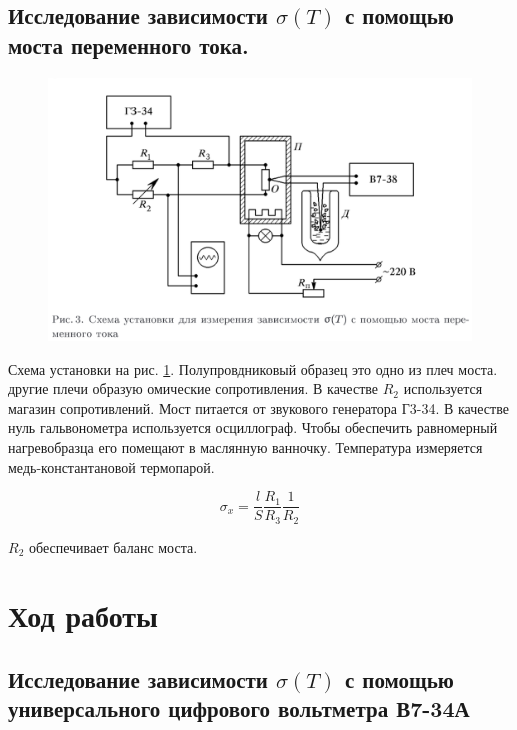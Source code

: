 \documentclass[a4paper]{article}
\begin{document}
\subsection{Исследование зависимости $\sigma(T)$ с помощью моста переменного тока.}

\begin{figure}[H]
    \begin{center}
        \includegraphics[scale = 0.5]{setup2.png}
        \caption{}
        \label{setup2}
    \end{center}
\end{figure}

Схема установки на рис. \ref{setup2}. Полупровдниковый образец это одно из плеч моста. другие плечи образую омические сопротивления. 
В качестве $R_2$ используется магазин сопротивлений. Мост питается от звукового генератора Г3-34. В качестве нуль гальвонометра используется осциллограф. 
Чтобы обеспечить равномерный нагревобразца его помещают в маслянную ванночку. Температура измеряется медь-константановой термопарой. 

\begin{equation}
    \sigma_x = \frac{l}{S} \frac{R_1}{R_3} \frac{1}{R_2}
\end{equation}

$R_2$ обеспечивает баланс моста. 




\section{Ход работы}


\subsection{Исследование зависимости $\sigma(T)$ с помощью универсального цифрового вольтметра В7-34А}
\end{document}
